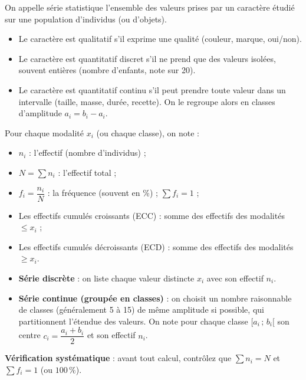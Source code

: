 \documentclass[11pt]{article}
\newcommand{\cle}[1]{{\popxbold\color{popdark}#1}}
\begin{document}
\begin{definition}
On appelle \cle{série statistique} l'ensemble des valeurs prises par un \cle{caractère} étudié sur une \cle{population} d'individus (ou d'objets).
\begin{itemize}
\item Le caractère est \cle{qualitatif} s'il exprime une qualité (couleur, marque, oui/non).
\item Le caractère est \cle{quantitatif discret} s'il ne prend que des valeurs isolées, souvent entières (nombre d'enfants, note sur 20).
\item Le caractère est \cle{quantitatif continu} s'il peut prendre toute valeur dans un intervalle (taille, masse, durée, recette). On le regroupe alors en \cle{classes} d'amplitude $a_i = b_i - a_i$.
\end{itemize}
Pour chaque \cle{modalité} $x_i$ (ou chaque classe), on note :
\begin{itemize}
\item $n_i$ : l'\cle{effectif} (nombre d'individus) ;
\item $N = \sum n_i$ : l'\cle{effectif total} ;
\item $f_i = \dfrac{n_i}{N}$ : la \cle{fréquence} (souvent en \%) ; $\sum f_i = 1$ ;
\item Les \cle{effectifs cumulés croissants} (ECC) : somme des effectifs des modalités $\le x_i$ ;
\item Les \cle{effectifs cumulés décroissants} (ECD) : somme des effectifs des modalités $\ge x_i$.
\end{itemize}
\end{definition}

\begin{aretenir}
\begin{itemize}
\item \textbf{Série discrète} : on liste chaque valeur distincte $x_i$ avec son effectif $n_i$.
\item \textbf{Série continue (groupée en classes)} : on choisit un nombre raisonnable de classes (généralement 5 à 15) de même amplitude si possible, qui partitionnent l'étendue des valeurs. On note pour chaque classe $[a_i\,;\,b_i[$ son centre $c_i = \dfrac{a_i+b_i}{2}$ et son effectif $n_i$.
\end{itemize}
\textbf{Vérification systématique} : avant tout calcul, contrôlez que $\sum n_i = N$ et $\sum f_i = 1$ (ou $100\,\%$).
\end{aretenir}
\end{document}
